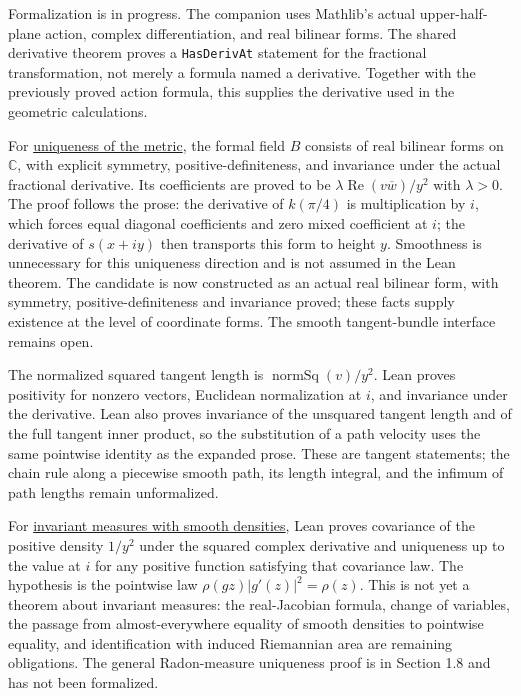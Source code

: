 Formalization is in progress. The companion uses Mathlib's actual upper-half-plane action, complex differentiation, and real bilinear forms. The shared derivative theorem proves a \texttt{HasDerivAt} statement for the fractional transformation, not merely a formula named a derivative. Together with the previously proved action formula, this supplies the derivative used in the geometric calculations.

For \hyperref[hyperbolic.invariant-geometry]{uniqueness of the metric}, the formal field $B$ consists of real bilinear forms on $\mathbb C$, with explicit symmetry, positive-definiteness, and invariance under the actual fractional derivative. Its coefficients are proved to be $\lambda\operatorname{Re}(v\overline w)/y^2$ with $\lambda>0$. The proof follows the prose: the derivative of $k(\pi/4)$ is multiplication by $i$, which forces equal diagonal coefficients and zero mixed coefficient at $i$; the derivative of $s(x+iy)$ then transports this form to height $y$. Smoothness is unnecessary for this uniqueness direction and is not assumed in the Lean theorem. The candidate is now constructed as an actual real bilinear form, with symmetry, positive-definiteness and invariance proved; these facts supply existence at the level of coordinate forms. The smooth tangent-bundle interface remains open.

The normalized squared tangent length is $\operatorname{normSq}(v)/y^2$. Lean proves positivity for nonzero vectors, Euclidean normalization at $i$, and invariance under the derivative. Lean also proves invariance of the unsquared tangent length and of the full tangent inner product, so the substitution of a path velocity uses the same pointwise identity as the expanded prose. These are tangent statements; the chain rule along a piecewise smooth path, its length integral, and the infimum of path lengths remain unformalized.

For \hyperref[hyperbolic.invariant-density]{invariant measures with smooth densities}, Lean proves covariance of the positive density $1/y^2$ under the squared complex derivative and uniqueness up to the value at $i$ for any positive function satisfying that covariance law. The hypothesis is the pointwise law $\rho(gz)|g'(z)|^2=\rho(z)$. This is not yet a theorem about invariant measures: the real-Jacobian formula, change of variables, the passage from almost-everywhere equality of smooth densities to pointwise equality, and identification with induced Riemannian area are remaining obligations. The general Radon-measure uniqueness proof is in Section 1.8 and has not been formalized.

